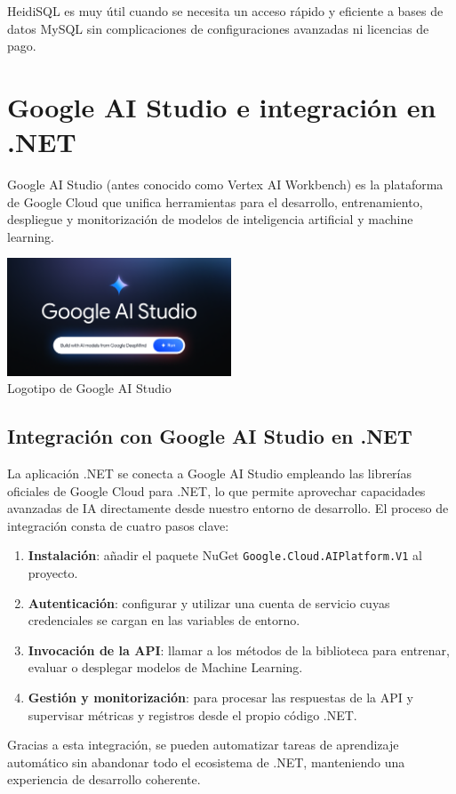 HeidiSQL es muy útil cuando se necesita un acceso rápido y eficiente a bases de datos MySQL sin complicaciones de configuraciones avanzadas ni licencias de pago.

\section{Google AI Studio e integración en .NET}\label{google-ai-studio}
Google AI Studio (antes conocido como Vertex AI Workbench) es la plataforma de Google Cloud que unifica herramientas para el desarrollo, entrenamiento, despliegue y monitorización de modelos de inteligencia artificial y machine learning. 

\begin{center}
  \includegraphics[width=0.5\textwidth]{img/ai-studio-logo.png}\\
  \small Logotipo de Google AI Studio
\end{center}

\subsection{Integración con Google AI Studio en .NET}

La aplicación .NET se conecta a Google AI Studio empleando las librerías oficiales de Google Cloud para .NET, lo que permite aprovechar capacidades avanzadas de IA directamente desde nuestro entorno de desarrollo. El proceso de integración consta de cuatro pasos clave:

\begin{enumerate}
  \item \textbf{Instalación}: añadir el paquete NuGet  
    \texttt{Google.Cloud.AIPlatform.V1} al proyecto.
  \item \textbf{Autenticación}: configurar y utilizar una cuenta de servicio  
    cuyas credenciales se cargan en las variables de entorno.
  \item \textbf{Invocación de la API}: llamar a los métodos de la biblioteca  
    para entrenar, evaluar o desplegar modelos de Machine Learning.
  \item \textbf{Gestión y monitorización}: para procesar las respuestas de la API y supervisar métricas y registros desde el propio código .NET.
\end{enumerate}

Gracias a esta integración, se pueden automatizar tareas de aprendizaje automático sin abandonar todo el ecosistema de .NET, manteniendo una experiencia de desarrollo coherente.
